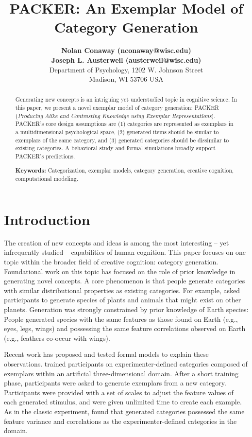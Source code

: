 \documentclass[10pt,letterpaper]{article}
\title{PACKER: An Exemplar Model of Category Generation}
\author{
{ \large \bf Nolan Conaway (nconaway@wisc.edu) } \\
{ \large \bf Joseph L. Austerweil (austerweil@wisc.edu) } \\
Department of Psychology, 1202 W. Johnson Street \\
Madison, WI 53706 USA
}
\begin{document}
\maketitle

\begin{abstract}

Generating new concepts is an intriguing yet understudied topic in cognitive science. In this paper, we present a novel exemplar model of category generation: PACKER (\textit{Producing Alike and Contrasting Knowledge using Exemplar Representations}). PACKER's core design assumptions are (1) categories are represented as exemplars in a multidimensional psychological space, (2) generated items should be similar to exemplars of the same category, and (3) generated categories should be dissimilar to existing categories. A behavioral study and formal simulations broadly support PACKER's predictions.

\textbf{Keywords:} 
Categorization, exemplar models, category generation, creative cognition, computational modeling.
\end{abstract}

\section{Introduction}

The creation of new concepts and ideas is among the most interesting -- yet infrequently studied -- capabilities of human cognition. This paper focuses on one topic within the broader field of creative cognition: category generation. Foundational work on this topic \citep[e.g.,][]{smith1993constraining,ward2002role,ward1994structured,ward1995s} has focused on the role of prior knowledge in generating novel concepts. A core phenomenon is that people generate categories with similar distributional properties as existing categories. For example, \citet{ward1994structured} asked participants to generate species of plants and animals that might exist on other planets. Generation was strongly constrained by prior knowledge of Earth species: People generated species with the same features as those found on Earth (e.g., eyes, legs, wings) and possessing the same feature correlations observed on Earth (e.g., feathers co-occur with wings). 

Recent work has proposed and tested formal models to explain these observations. \citet{jern2013probabilistic} trained participants on experimenter-defined categories composed of exemplars within an artificial three-dimensional domain. After a short training phase, participants were asked to generate exemplars from a new category. Participants were provided with a set of scales to adjust the feature values of each generated stimulus, and were given unlimited time to create each example. As in the classic \cite{ward1994structured} experiment, \citet{jern2013probabilistic} found that generated categories possessed the same feature variance and correlations as the experimenter-defined categories in the domain. 
\end{document}
